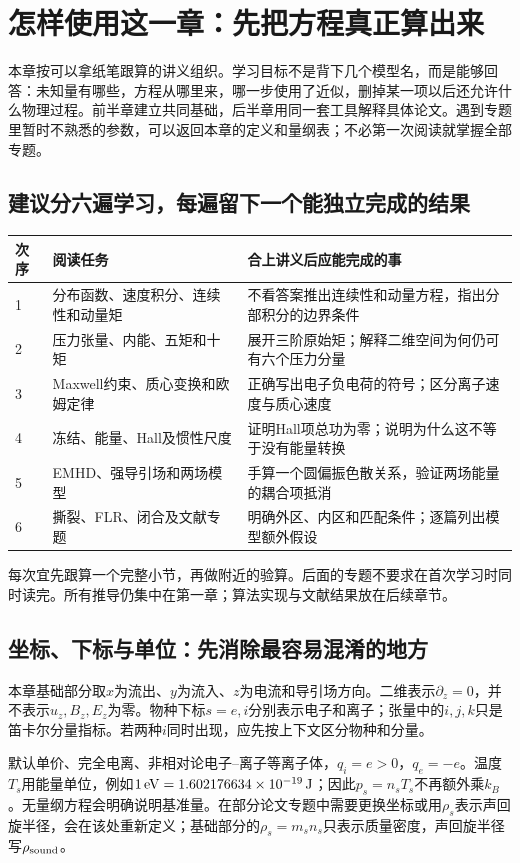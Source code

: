 \section{怎样使用这一章：先把方程真正算出来}
\label{sec:tutorial-start}
本章按可以拿纸笔跟算的讲义组织。学习目标不是背下几个模型名，而是能够回答：未知量有哪些，方程从哪里来，哪一步使用了近似，删掉某一项以后还允许什么物理过程。前半章建立共同基础，后半章用同一套工具解释具体论文。遇到专题里暂时不熟悉的参数，可以返回本章的定义和量纲表；不必第一次阅读就掌握全部专题。

\subsection{建议分六遍学习，每遍留下一个能独立完成的结果}
\begin{longtable}{P{14mm}P{66mm}P{69mm}}
\toprule 次序 & 阅读任务 & 合上讲义后应能完成的事\\ & 分布函数、速度积分、连续性和动量矩 & 不看答案推出连续性和动量方程，指出分部积分的边界条件\\
2 & 压力张量、内能、五矩和十矩 & 展开三阶原始矩；解释二维空间为何仍可有六个压力分量\\
3 & Maxwell约束、质心变换和欧姆定律 & 正确写出电子负电荷的符号；区分离子速度与质心速度\\
4 & 冻结、能量、Hall及惯性尺度 & 证明Hall项总功为零；说明为什么这不等于没有能量转换\\
5 & EMHD、强导引场和两场模型 & 手算一个圆偏振色散关系，验证两场能量的耦合项抵消\\
6 & 撕裂、FLR、闭合及文献专题 & 明确外区、内区和匹配条件；逐篇列出模型额外假设\\\bottomrule
\end{longtable}
每次宜先跟算一个完整小节，再做附近的验算。后面的专题不要求在首次学习时同时读完。所有推导仍集中在第一章；算法实现与文献结果放在后续章节。

\subsection{坐标、下标与单位：先消除最容易混淆的地方}
本章基础部分取$x$为流出、$y$为流入、$z$为电流和导引场方向。二维表示$\partial_z=0$，并不表示$u_z,B_z,E_z$为零。物种下标$s=e,i$分别表示电子和离子；张量中的$i,j,k$只是笛卡尔分量指标。若两种$i$同时出现，应先按上下文区分物种和分量。

默认单价、完全电离、非相对论电子--离子等离子体，$q_i=e>0$，$q_e=-e$。温度$T_s$用能量单位，例如$1\,{\rm eV}=1.602176634\times10^{-19}\,{\rm J}$；因此$p_s=n_sT_s$不再额外乘$k_B$。无量纲方程会明确说明基准量。在部分论文专题中需要更换坐标或用$\rho_s$表示声回旋半径，会在该处重新定义；基础部分的$\rho_s=m_sn_s$只表示质量密度，声回旋半径写$\rho_{\rm sound}$。

